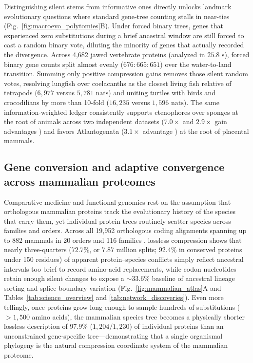 \documentclass[11pt,a4paper]{article}
\begin{document}
Distinguishing silent stems from informative ones directly unlocks landmark evolutionary questions where standard gene-tree counting stalls in near-ties \citep{shen2017contentious} (Fig.~\ref{fig:macroevo_polytomies}B). Under forced binary trees, genes that experienced zero substitutions during a brief ancestral window are still forced to cast a random binary vote, diluting the minority of genes that actually recorded the divergence. Across 4,682 jawed vertebrate proteins \citep{chen2015identifying} (analyzed in $25.8\text{ s}$), forced binary gene counts split almost evenly ($676 : 665 : 651$) over the water-to-land transition. Summing only positive compression gains removes those silent random votes, resolving lungfish over coelacanths as the closest living fish relative of tetrapods ($6,977$ versus $5,781\text{ nats}$) and uniting turtles with birds and crocodilians by more than 10-fold ($16,235$ versus $1,596\text{ nats}$). The same information-weighted ledger consistently supports ctenophores over sponges at the root of animals across two independent datasets ($7.0\times$ and $2.9\times$ gain advantages \citep{borowiec2015extracting,whelan2017ctenophore}) and favors Atlantogenata ($3.1\times$ advantage \citep{song2012resolving}) at the root of placental mammals.

\subsection*{Gene conversion and adaptive convergence across mammalian proteomes}

Comparative medicine and functional genomics rest on the assumption that orthologous mammalian proteins track the evolutionary history of the species that carry them, yet individual protein trees routinely scatter species across families and orders. Across all 19,952 orthologous coding alignments spanning up to 882 mammals in 20 orders and 116 families \citep{kirilenko2023integrating,malovichko2026toga2}, lossless compression shows that nearly three-quarters ($72.7\%$, or $7.87\text{ million}$ splits; $92.4\%$ in conserved proteins under 150 residues) of apparent protein--species conflicts simply reflect ancestral intervals too brief to record amino-acid replacements, while codon nucleotides retain enough silent changes to expose a $\sim 33.6\%$ baseline of ancestral lineage sorting and splice-boundary variation (Fig.~\ref{fig:mammalian_atlas}A and Tables~\ref{tab:science_overview} and \ref{tab:network_discoveries}). Even more tellingly, once proteins grow long enough to sample hundreds of substitutions ($>1,500$ amino acids), the mammalian species tree becomes a physically shorter lossless description of $97.9\%$ ($1,204 / 1,230$) of individual proteins than an unconstrained gene-specific tree---demonstrating that a single organismal phylogeny is the natural compression coordinate system of the mammalian proteome.
\end{document}
